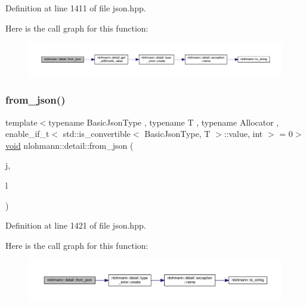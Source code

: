 Definition at line 1411 of file json.\+hpp.

Here is the call graph for this function\+:
\nopagebreak
\begin{figure}[H]
\begin{center}
\leavevmode
\includegraphics[width=350pt]{namespacenlohmann_1_1detail_a5440d650150d01e8015133521351b459_cgraph}
\end{center}
\end{figure}
\mbox{\label{namespacenlohmann_1_1detail_a5cfb765aad92795abd7fda29d017272a}} 
\subsubsection{\texorpdfstring{from\_json()}{from\_json()}\hspace{0.1cm}{\footnotesize\ttfamily [9/18]}}
{\footnotesize\ttfamily template$<$typename Basic\+Json\+Type , typename T , typename Allocator , enable\+\_\+if\+\_\+t$<$ std\+::is\+\_\+convertible$<$ Basic\+Json\+Type, T $>$\+::value, int $>$  = 0$>$ \\
\mbox{\hyperlink{namespacenlohmann_1_1detail_a59fca69799f6b9e366710cb9043aa77d}{void}} nlohmann\+::detail\+::from\+\_\+json (\begin{DoxyParamCaption}\item[{const Basic\+Json\+Type \&}]{j,  }\item[{std\+::forward\+\_\+list$<$ T, Allocator $>$ \&}]{l }\end{DoxyParamCaption})}



Definition at line 1421 of file json.\+hpp.

Here is the call graph for this function\+:
\nopagebreak
\begin{figure}[H]
\begin{center}
\leavevmode
\includegraphics[width=350pt]{namespacenlohmann_1_1detail_a5cfb765aad92795abd7fda29d017272a_cgraph}
\end{center}
\end{figure}
\mbox{\label{namespacenlohmann_1_1detail_a3df497b1d3977f071b488ecac1401517}} 
